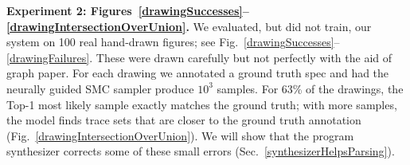 \documentclass{article}
\theoremstyle{definition}
\begin{document}

  \textbf{Experiment 2: Figures~\ref{drawingSuccesses}--\ref{drawingIntersectionOverUnion}.}
    We evaluated, but did not train, our system on 100 real hand-drawn figures; see Fig.~\ref{drawingSuccesses}--\ref{drawingFailures}.
These were drawn carefully but not perfectly with the aid of graph paper.
For each drawing we annotated a ground truth spec and had the neurally guided SMC sampler
produce $10^3$ samples. %
For 63\% of the drawings, the Top-1 most likely sample exactly matches the
ground truth; with more samples, the model finds trace sets
that are closer to the ground truth annotation (Fig.~\ref{drawingIntersectionOverUnion}).
We will show that the program synthesizer
corrects some of these small errors (Sec.~\ref{synthesizerHelpsParsing}).
\end{document}
